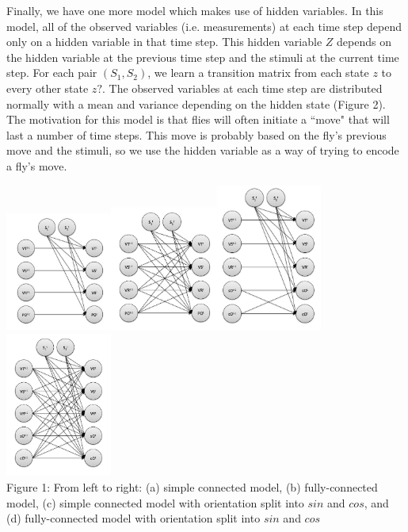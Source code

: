 \documentclass{article} %
\begin{document}
Finally, we have one more model which makes use of hidden variables. In this model, all of the observed variables (i.e. measurements) at each time step depend only on a hidden variable in that time step. This hidden variable $Z$ depends on the hidden variable at the previous time step and the stimuli at the current time step. For each pair $(S_1,S_2)$, we learn a transition matrix from each state $z$ to every other state $z?$. The observed variables at each time step are distributed normally with a mean and variance depending on the hidden state (Figure 2). The motivation for this model is that flies will often initiate a ``move" that will last a number of time steps. This move is probably based on the fly's previous move and the stimuli, so we use the hidden variable as a way of trying to encode a fly's move.

\includegraphics[width=3.5cm]{simple.jpg}\includegraphics[width=3.5cm]{full.jpg}\includegraphics[width=3.5cm]{simple-sincos.jpg}\includegraphics[width=3.5cm]{full-sincos.jpg}\\
\small{Figure 1: From left to right: (a) simple connected model, (b) fully-connected model, (c) simple connected model with orientation split into $sin$ and $cos$, and (d) fully-connected model with orientation split into $sin$ and $cos$} %
\end{document}
